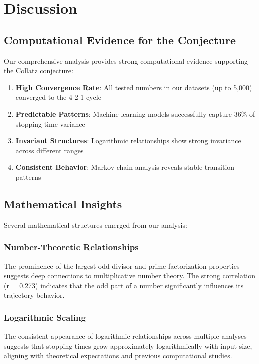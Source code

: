 \documentclass[12pt,a4paper]{article}
\begin{document}
\section{Discussion}

\subsection{Computational Evidence for the Conjecture}

Our comprehensive analysis provides strong computational evidence supporting the Collatz conjecture:

\begin{enumerate}
\item \textbf{High Convergence Rate}: All tested numbers in our datasets (up to 5,000) converged to the 4-2-1 cycle
\item \textbf{Predictable Patterns}: Machine learning models successfully capture 36\% of stopping time variance
\item \textbf{Invariant Structures}: Logarithmic relationships show strong invariance across different ranges
\item \textbf{Consistent Behavior}: Markov chain analysis reveals stable transition patterns
\end{enumerate}

\subsection{Mathematical Insights}

Several mathematical structures emerged from our analysis:

\subsubsection{Number-Theoretic Relationships}
The prominence of the largest odd divisor and prime factorization properties suggests deep connections to multiplicative number theory. The strong correlation (r = 0.273) indicates that the odd part of a number significantly influences its trajectory behavior.

\subsubsection{Logarithmic Scaling}
The consistent appearance of logarithmic relationships across multiple analyses suggests that stopping times grow approximately logarithmically with input size, aligning with theoretical expectations and previous computational studies.
\end{document}
